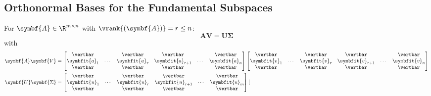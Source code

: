 \documentclass{article}
\begin{document}
\begin{multicols*}{3}
    \subsection{Orthonormal Bases for the Fundamental Subspaces}
    For \(\symbf{A}\in\R^{m \times n}\) with \(\vrank{\left( \symbf{A} \right)} = r \leq n\):
    \begin{equation*}
        \symbf{A} \symbf{V} = \symbf{U} \symbf{\Sigma}
    \end{equation*}
    with
    \begin{align*}
        \symbf{A} \symbf{V}      & = \begin{bmatrix}
                                         \vertbar      &        & \vertbar      & \vertbar          &        & \vertbar      \\
                                         \symbfit{a}_1 & \cdots & \symbfit{a}_r & \symbfit{a}_{r+1} & \cdots & \symbfit{a}_n \\
                                         \vertbar      &        & \vertbar      & \vertbar          &        & \vertbar
                                     \end{bmatrix} \begin{bmatrix}
                                                       \vertbar      &        & \vertbar      & \vertbar          &        & \vertbar      \\
                                                       \symbfit{v}_1 & \cdots & \symbfit{v}_r & \symbfit{v}_{r+1} & \cdots & \symbfit{v}_n \\
                                                       \vertbar      &        & \vertbar      & \vertbar          &        & \vertbar
                                                   \end{bmatrix} \\
        \symbf{U} \symbf{\Sigma} & = \begin{bmatrix}
                                         \vertbar      &        & \vertbar      & \vertbar          &        & \vertbar      \\
                                         \symbfit{u}_1 & \cdots & \symbfit{u}_r & \symbfit{u}_{r+1} & \cdots & \symbfit{u}_m \\
                                         \vertbar      &        & \vertbar      & \vertbar          &        & \vertbar
                                     \end{bmatrix} \begin{bmatrix}

\end{bmatrix}
\end{align*}
\end{multicols*}
\end{document}
